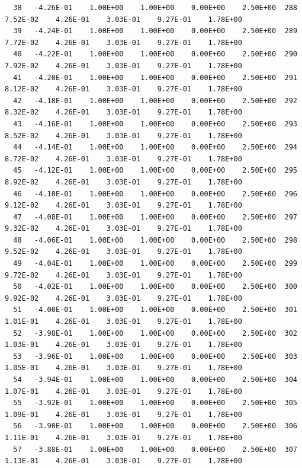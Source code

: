 \documentclass[10pt,letterpaper,notitlepage]{article}
\numberwithin{equation}{section}
\begin{document}
\begin{appendices}
{\begin{verbatim}
  38   -4.26E-01    1.00E+00    1.00E+00    0.00E+00    2.50E+00  288    7.52E-02    4.26E-01    3.03E-01    9.27E-01    1.78E+00
  39   -4.24E-01    1.00E+00    1.00E+00    0.00E+00    2.50E+00  289    7.72E-02    4.26E-01    3.03E-01    9.27E-01    1.78E+00
  40   -4.22E-01    1.00E+00    1.00E+00    0.00E+00    2.50E+00  290    7.92E-02    4.26E-01    3.03E-01    9.27E-01    1.78E+00
  41   -4.20E-01    1.00E+00    1.00E+00    0.00E+00    2.50E+00  291    8.12E-02    4.26E-01    3.03E-01    9.27E-01    1.78E+00
  42   -4.18E-01    1.00E+00    1.00E+00    0.00E+00    2.50E+00  292    8.32E-02    4.26E-01    3.03E-01    9.27E-01    1.78E+00
  43   -4.16E-01    1.00E+00    1.00E+00    0.00E+00    2.50E+00  293    8.52E-02    4.26E-01    3.03E-01    9.27E-01    1.78E+00
  44   -4.14E-01    1.00E+00    1.00E+00    0.00E+00    2.50E+00  294    8.72E-02    4.26E-01    3.03E-01    9.27E-01    1.78E+00
  45   -4.12E-01    1.00E+00    1.00E+00    0.00E+00    2.50E+00  295    8.92E-02    4.26E-01    3.03E-01    9.27E-01    1.78E+00
  46   -4.10E-01    1.00E+00    1.00E+00    0.00E+00    2.50E+00  296    9.12E-02    4.26E-01    3.03E-01    9.27E-01    1.78E+00
  47   -4.08E-01    1.00E+00    1.00E+00    0.00E+00    2.50E+00  297    9.32E-02    4.26E-01    3.03E-01    9.27E-01    1.78E+00
  48   -4.06E-01    1.00E+00    1.00E+00    0.00E+00    2.50E+00  298    9.52E-02    4.26E-01    3.03E-01    9.27E-01    1.78E+00
  49   -4.04E-01    1.00E+00    1.00E+00    0.00E+00    2.50E+00  299    9.72E-02    4.26E-01    3.03E-01    9.27E-01    1.78E+00
  50   -4.02E-01    1.00E+00    1.00E+00    0.00E+00    2.50E+00  300    9.92E-02    4.26E-01    3.03E-01    9.27E-01    1.78E+00
  51   -4.00E-01    1.00E+00    1.00E+00    0.00E+00    2.50E+00  301    1.01E-01    4.26E-01    3.03E-01    9.27E-01    1.78E+00
  52   -3.98E-01    1.00E+00    1.00E+00    0.00E+00    2.50E+00  302    1.03E-01    4.26E-01    3.03E-01    9.27E-01    1.78E+00
  53   -3.96E-01    1.00E+00    1.00E+00    0.00E+00    2.50E+00  303    1.05E-01    4.26E-01    3.03E-01    9.27E-01    1.78E+00
  54   -3.94E-01    1.00E+00    1.00E+00    0.00E+00    2.50E+00  304    1.07E-01    4.26E-01    3.03E-01    9.27E-01    1.78E+00
  55   -3.92E-01    1.00E+00    1.00E+00    0.00E+00    2.50E+00  305    1.09E-01    4.26E-01    3.03E-01    9.27E-01    1.78E+00
  56   -3.90E-01    1.00E+00    1.00E+00    0.00E+00    2.50E+00  306    1.11E-01    4.26E-01    3.03E-01    9.27E-01    1.78E+00
  57   -3.88E-01    1.00E+00    1.00E+00    0.00E+00    2.50E+00  307    1.13E-01    4.26E-01    3.03E-01    9.27E-01    1.78E+00

\end{verbatim}}
\end{appendices}
\end{document}
